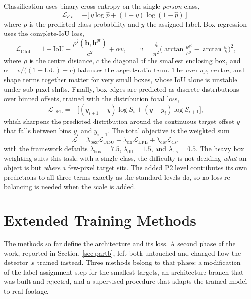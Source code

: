 Classification uses binary cross-entropy on the single \emph{person} class,
\begin{equation}
  \mathcal{L}_{\mathrm{cls}} = -\big[\, y \log \hat{p} + (1-y)\log(1-\hat{p}) \,\big],
\end{equation}
where $\hat{p}$ is the predicted class probability and $y$ the
assigned label. Box regression uses the complete-IoU loss,
\begin{equation}
  \mathcal{L}_{\mathrm{CIoU}} = 1 - \mathrm{IoU}
      + \frac{\rho^2(\mathbf{b}, \mathbf{b}^{gt})}{c^2} + \alpha v,
  \qquad
  v = \frac{4}{\pi^2}\Big(\arctan\tfrac{w^{gt}}{h^{gt}} - \arctan\tfrac{w}{h}\Big)^{\!2},
\end{equation}
where $\rho$ is the centre distance, $c$ the diagonal of the smallest enclosing
box, and $\alpha = v / \big((1-\mathrm{IoU}) + v\big)$ balances the aspect-ratio
term. The overlap, centre, and shape terms together matter for very small boxes,
whose IoU alone is unstable under sub-pixel shifts. Finally, box edges are
predicted as discrete distributions over binned offsets, trained with the
distribution focal loss,
\begin{equation}
  \mathcal{L}_{\mathrm{DFL}} = -\big[(y_{i+1}-y)\log S_i + (y-y_i)\log S_{i+1}\big],
\end{equation}
which sharpens the predicted distribution around the continuous target offset
$y$ that falls between bins $y_i$ and $y_{i+1}$. The total objective is the
weighted sum
\begin{equation}
  \mathcal{L} = \lambda_{\mathrm{box}} \mathcal{L}_{\mathrm{CIoU}}
              + \lambda_{\mathrm{dfl}} \mathcal{L}_{\mathrm{DFL}}
              + \lambda_{\mathrm{cls}} \mathcal{L}_{\mathrm{cls}},
\end{equation}
with the framework defaults $\lambda_{\mathrm{box}} = 7.5$,
$\lambda_{\mathrm{dfl}} = 1.5$, and $\lambda_{\mathrm{cls}} = 0.5$. The heavy
box weighting suits this task: with a single class, the difficulty is not
deciding \emph{what} an object is but \emph{where} a few-pixel target sits. The
added P2 level contributes its own predictions to all three terms exactly as
the standard levels do, so no loss re-balancing is needed when the scale is
added.

\section{Extended Training Methods}
The methods so far define the architecture and its loss. A second phase of the
work, reported in Section~\ref{sec:partb}, left both untouched and changed how
the detector is trained instead. Three methods belong to that phase: a
modification of the label-assignment step for the smallest targets, an
architecture branch that was built and rejected, and a supervised procedure
that adapts the trained model to real footage.

